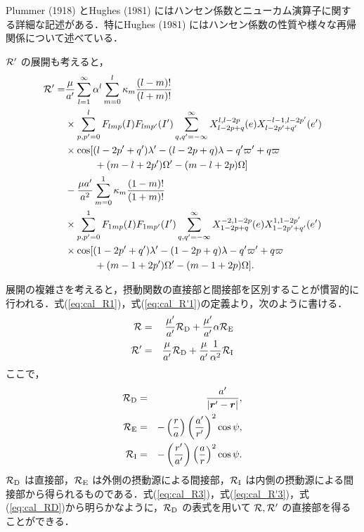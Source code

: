 \documentclass[11pt,a4paper,oneside,onecolumn]{jreport}
\begin{document}
Plummer (1918) とHughes (1981) にはハンセン係数とニューカム演算子に関する詳細な記述がある．特にHughes (1981) にはハンセン係数の性質や様々な再帰関係について述べている．

${\cal R'}$ の展開も考えると，
\begin{equation}
\begin{split}
{\cal R'} = & \frac{\mu}{a'} \sum_{l = 1}^{\infty} \alpha^l \sum_{m = 0}^l \kappa_m \frac{(l - m) !}{(l + m) !} \\
& \times \sum_{p,p' = 0}^l F_{lmp} (I) F_{lmp'} (I') \sum_{q,q' = - \infty}^{\infty} X_{l - 2p + q}^{l, l - 2p} (e) X_{l - 2p' + q'}^{-l -1, l - 2p'} (e') \\
& \times \cos [ (l - 2p' + q') \lambda' - (l - 2p + q) \lambda - q' \varpi' + q \varpi \\
& \quad \quad \quad + (m - l + 2p') \Omega' - (m - l + 2p) \Omega ] \\
& - \frac{\mu a'}{a^2} \sum_{m = 0}^1 \kappa_m \frac{(1 - m) !}{(1 + m) !} \\
& \times \sum_{p,p' = 0}^1 F_{1mp} (I) F_{1mp'} (I') \sum_{q,q' = - \infty}^{\infty} X_{1 - 2p + q}^{-2, 1 - 2p} (e) X_{1 - 2p' + q'}^{1, 1 - 2p'} (e') \\
& \times \cos [ (1 - 2p' +q') \lambda' - (1 -2p + q) \lambda - q' \varpi' +q \varpi \\
& \quad \quad \quad + (m - 1 + 2p') \Omega' - (m - 1 + 2p) \Omega ].
\end{split}
\end{equation}

展開の複雑さを考えると，摂動関数の直接部と間接部を区別することが慣習的に行われる．式(\ref{eq:cal_R1})，式(\ref{eq:cal_R'1})の定義より，次のように書ける．
\begin{eqnarray}
{\cal R} & = & \frac{\mu'}{a'} {\cal R}_{\rm D} + \frac{\mu'}{a'} \alpha {\cal R}_{\rm E} \label{eq:cal_R3} \\
{\cal R'} & = & \frac{\mu}{a'} {\cal R}_{\rm D} + \frac{\mu}{a'} \frac{1}{\alpha^2} {\cal R}_{\rm I} \label{eq:cal_R'3}
\end{eqnarray}
ここで，
\begin{eqnarray}
{\cal R}_{\rm D} & = & \frac{a'}{|{\bm r'} - {\bm r}|}, \label{eq:cal_RD}\\
{\cal R}_{\rm E} & = & - \left( \frac{r}{a} \right) \left( \frac{a'}{r'} \right)^2 \cos \psi, \label{eq:cal_RE} \\
{\cal R}_{\rm I} & = & - \left( \frac{r'}{a'} \right) \left( \frac{a}{r} \right)^2 \cos \psi. \label{eq:cal_RI}
\end{eqnarray}
${\cal R}_{\rm D}$ は直接部，${\cal R}_{\rm E}$ は外側の摂動源による間接部，${\cal R}_{\rm I}$ は内側の摂動源による間接部から得られるものである．式(\ref{eq:cal_R3})，式(\ref{eq:cal_R'3})，式(\ref{eq:cal_RD})から明らかなように，${\cal R}_{\rm D}$ の表式を用いて ${\cal R}, {\cal R'}$ の直接部を得ることができる．
\end{document}
